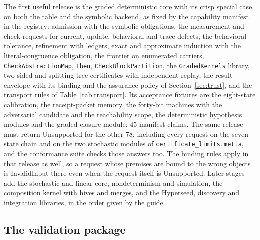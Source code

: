 \documentclass[11pt]{article}
\newcommand{\code}[1]{\texttt{#1}}
\theoremstyle{definition}
\theoremstyle{plain}
\begin{document}
The first useful release is the graded deterministic core with its crisp special case, on both the
table and the symbolic backend, as fixed by the capability manifest in the registry: admission
with the symbolic obligations, the measurement and check requests for current, update, behavioral
and trace defects, the behavioral tolerance, refinement with ledgers, exact and approximate
induction with the literal-congruence obligation, the frontier on enumerated carriers,
\code{CheckAbstractionMap}, \code{Then}, \code{CheckBlockPartition}, the \code{GradedKernels} library,
two-sided and splitting-tree certificates with independent replay, the result envelope with its
binding and the assurance policy of Section~\ref{sec:trust}, and the transport rules of
Table~\ref{tab:transport}. Its acceptance fixtures are the eight-state calibration, the
receipt-packet memory, the forty-bit machines with the adversarial candidate and the reachability
scope, the deterministic hypothesis modules and the graded-closure module: $45$ manifest claims. The
same release must return Unsupported for the other $78$, including every request on the seven-state
chain and on the two stochastic modules of \code{certificate\_limits.metta}, and the conformance
suite checks those answers too. The binding rules apply in that release as well, so a request whose
premises are bound to the wrong objects is InvalidInput there even when the request itself is
Unsupported. Later stages add the stochastic and linear core, nondeterminism and
simulation, the composition kernel with hives and merges, and the Hyperseed, discovery and
integration libraries, in the order given by the guide.

\subsection{The validation package}\label{sec:validation}
\end{document}
